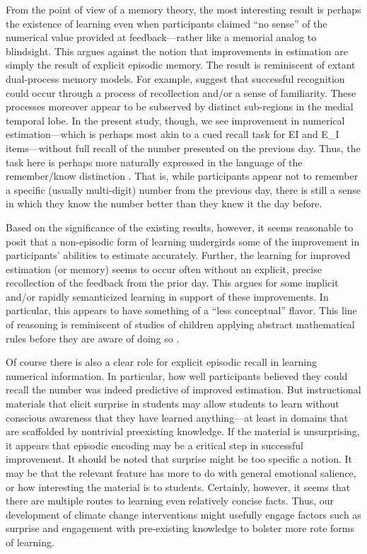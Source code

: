 From the point of view of a memory theory, the most interesting result is
perhaps the existence of learning even when participants claimed “no sense” of
the numerical value provided at feedback---rather like a memorial analog to
blindsight. This argues against the notion that improvements in estimation are
simply the result of explicit episodic memory. The result is reminiscent of
extant dual-process memory models.  For example, \textcite{davachi_multiple_2003}
suggest that successful recognition could occur through a process of
recollection and/or a sense of familiarity.  These processes moreover appear to
be subserved by distinct sub-regions in the medial temporal lobe.  In the
present study, though, we see improvement in numerical estimation---which is
perhaps most akin to a cued recall task for EI and E\_I items---without full
recall of the number presented on the previous day.  Thus, the task here is
perhaps more naturally expressed in the language of the remember/know
distinction \parencite{knowlton_relationship_1998}.  That is, while participants
appear not to remember a specific (usually multi-digit) number from the previous
day, there is still a sense in which they know the number better than they knew
it the day before.

Based on the significance of the existing results, however, it seems reasonable
to posit that a non-episodic form of learning undergirds some of the improvement
in participants’ abilities to estimate accurately.  Further, the learning for
improved estimation (or memory) seems to occur often without an explicit, precise
recollection of the feedback from the prior day.  This argues for some implicit
and/or rapidly semanticized learning in support of these improvements. In
particular, this appears to have something of a ``less conceptual'' flavor.
This line of reasoning is reminiscent of studies of children applying abstract
mathematical rules before they are aware of doing so
\parencite{siegler_unconscious_2000}.

Of course there is also a clear role for explicit episodic recall in learning
numerical information. In particular, how well participants believed they could
recall the number was indeed predictive of improved estimation. But
instructional materials that elicit surprise in students may allow students to
learn without conscious awareness that they have learned anything---at least in
domains that are scaffolded by nontrivial preexisting knowledge. If the material
is unsurprising, it appears that episodic encoding may be a critical step in
successful improvement. It should be noted that surprise might be too specific a
notion. It may be that the relevant feature has more to do with general
emotional salience, or how interesting the material is to students. Certainly,
however, it seems that there are multiple routes to learning even relatively
concise facts. Thus, our development of climate change interventions might
usefully engage factors such as surprise and engagement with pre-existing
knowledge to bolster more rote forms of learning.

